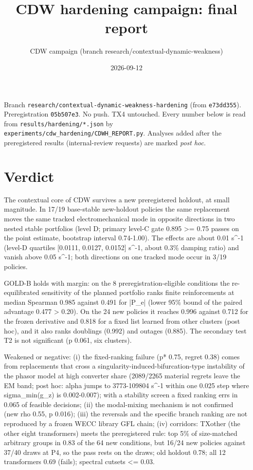 \documentclass[10pt,a4paper]{article}
\title{CDW hardening campaign: final report}
\date{2026-09-12}
\author{CDW campaign (branch research/contextual-dynamic-weakness)}
\begin{document}
\maketitle
\tableofcontents
\newpage
Branch \texttt{research/\allowbreak{}contextual-dynamic-weakness-hardening} (from \texttt{e73dd355}). Preregistration \texttt{05b507e3}. No push. TX4 untouched. Every number below is read from \texttt{results/\allowbreak{}hardening/\allowbreak{}*.json} by \texttt{experiments/\allowbreak{}cdw\_\allowbreak{}hardening/\allowbreak{}CDWH\_\allowbreak{}REPORT.py}. Analyses added after the preregistered results (internal-review requests) are marked \emph{post hoc}.

\section{Verdict}
The contextual core of CDW survives a new preregistered holdout, at small magnitude. In 17/19 base-stable new-holdout policies the same replacement moves the same tracked electromechanical mode in opposite directions in two nested stable portfolios (level D; primary level-C gate 0.895 >= 0.75 passes on the point estimate, bootstrap interval 0.74-1.00). The effects are about 0.01 s\textasciicircum{}-1 (level-D quartiles [0.0111, 0.0127, 0.0152] s\textasciicircum{}-1, about 0.3\% damping ratio) and vanish above 0.05 s\textasciicircum{}-1; both directions on one tracked mode occur in 3/19 policies.

GOLD-B holds with margin: on the 8 preregistration-eligible conditions the re-equilibrated sensitivity of the planned portfolio ranks finite reinforcements at median Spearman 0.985 against 0.491 for |P\_e| (lower 95\% bound of the paired advantage 0.477 > 0.20). On the 24 new policies it reaches 0.996 against 0.712 for the frozen derivative and 0.818 for a fixed list learned from other clusters (post hoc), and it also ranks doublings (0.992) and outages (0.885). The secondary test T2 is not significant (p 0.061, six clusters).

Weakened or negative: (i) the fixed-ranking failure (p* 0.75, regret 0.38) comes from replacements that cross a singularity-induced-bifurcation-type instability of the phasor model at high converter share (2089/2265 material regrets leave the EM band; post hoc: alpha jumps to 3773-109804 s\textasciicircum{}-1 within one 0.025 step where sigma\_min(g\_z) is 0.002-0.007); with a stability screen a fixed ranking errs in 0.065 of feasible decisions; (ii) the modal-mixing mechanism is not confirmed (new rho 0.55, p 0.016); (iii) the reversals and the specific branch ranking are not reproduced by a frozen WECC library GFL chain; (iv) corridors: TXother (the other eight transformers) meets the preregistered rule: top 5\% of size-matched arbitrary groups in 0.83 of the 64 new conditions, but 16/24 new policies against 37/40 draws at P4, so the pass rests on the draws; old holdout 0.78; all 12 transformers 0.69 (fails); spectral cutsets <= 0.03.
\end{document}
